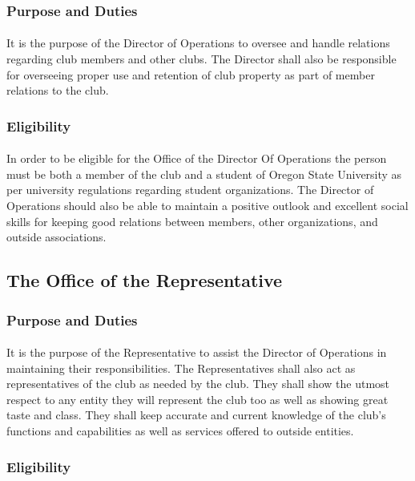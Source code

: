 \documentclass[12pt]{article}
\begin{document}
\subsubsection{Purpose and Duties}
\paragraph{}
It is the purpose of the Director of Operations to oversee and handle relations regarding club members and other clubs. The Director shall also be responsible for overseeing proper use and retention of club property as 
part of member relations to the club. 
\subsubsection{Eligibility}
\paragraph{}
In order to be eligible for the Office of the Director Of Operations the person must be both a member of the club and a student of Oregon State University as per university regulations regarding student organizations.
The Director of Operations should also be able to maintain a positive outlook and excellent social
skills for keeping good relations between members, other organizations, and outside associations. 


\subsection{The Office of the Representative}
\subsubsection{Purpose and Duties}
\paragraph{}
It is the purpose of the Representative to assist the Director of Operations in maintaining their responsibilities. The Representatives shall also act as representatives of the club as needed by the club. They shall show
the utmost respect to any entity they will represent the club too as well as showing great taste and class. They shall keep accurate and current knowledge of the club's functions and capabilities as well
as services offered to outside entities.
\subsubsection{Eligibility}
\end{document}
